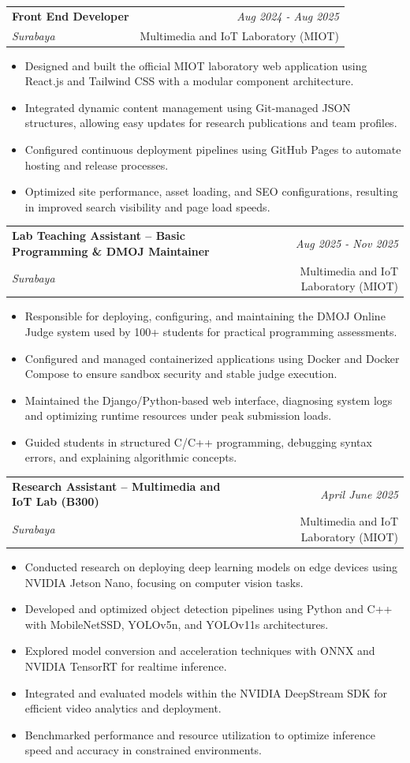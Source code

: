 \documentclass[a4paper,11pt]{article}
\makeatletter
\newcommand{\resumeSubheading}[4]{
\vspace{0.5mm}\item
    \begin{tabular*}{0.98\textwidth}[t]{l@{\extracolsep{\fill}}r}
        \textbf{#1} & \textit{\footnotesize{#4}} \\
        \textit{\footnotesize{#3}} &  \footnotesize{#2}\\
    \end{tabular*}
    \vspace{-2.4mm}
}
\newcommand{\resumeItemListStart}{\begin{justify}\begin{itemize}[leftmargin=3ex, rightmargin=2ex, noitemsep,labelsep=1.2mm,itemsep=0mm]\small}
\newcommand{\resumeItemListEnd}{\end{itemize}\end{justify}\vspace{-2mm}}
\makeatother
\begin{document}
\resumeSubheading
{Front End Developer}{Multimedia and IoT Laboratory (MIOT)}
{Surabaya}{Aug 2024 \-- Aug 2025}
\resumeItemListStart
\item {Designed and built the official MIOT laboratory web application using React.js and Tailwind CSS with a modular component architecture.}
\item {Integrated dynamic content management using Git-managed JSON structures, allowing easy updates for research publications and team profiles.}
\item {Configured continuous deployment pipelines using GitHub Pages to automate hosting and release processes.}
\item {Optimized site performance, asset loading, and SEO configurations, resulting in improved search visibility and page load speeds.}
\resumeItemListEnd

\resumeSubheading
{Lab Teaching Assistant – Basic Programming \& DMOJ Maintainer}{Multimedia and IoT Laboratory (MIOT)}
{Surabaya}{Aug 2025 \-- Nov 2025}
\resumeItemListStart
\item {Responsible for deploying, configuring, and maintaining the DMOJ Online Judge system used by 100+ students for practical programming assessments.}
\item {Configured and managed containerized applications using Docker and Docker Compose to ensure sandbox security and stable judge execution.}
\item {Maintained the Django/Python-based web interface, diagnosing system logs and optimizing runtime resources under peak submission loads.}
\item {Guided students in structured C/C++ programming, debugging syntax errors, and explaining algorithmic concepts.}
\resumeItemListEnd

\resumeSubheading
{Research Assistant – Multimedia and IoT Lab (B300)}{Multimedia and IoT Laboratory (MIOT)}
{Surabaya}{April \- June 2025}
\resumeItemListStart
\item {Conducted research on deploying deep learning models on edge devices using NVIDIA Jetson Nano, focusing on computer vision tasks.}
\item {Developed and optimized object detection pipelines using Python and C++ with MobileNet\-SSD, YOLOv5n, and YOLOv11s architectures.}
\item {Explored model conversion and acceleration techniques with ONNX and NVIDIA TensorRT for real\-time inference.}
\item {Integrated and evaluated models within the NVIDIA DeepStream SDK for efficient video analytics and deployment.}
\item {Benchmarked performance and resource utilization to optimize inference speed and accuracy in constrained environments.}
\resumeItemListEnd
\end{document}
